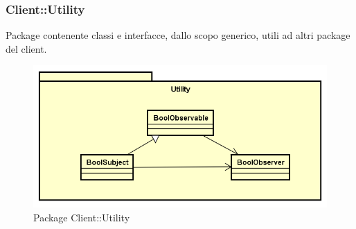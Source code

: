 \subsubsection{Client::Utility}
Package contenente classi e interfacce, dallo scopo generico, utili ad altri package del client.
\begin{figure}[h] \centering \includegraphics[width=\textwidth,height=\textheight,keepaspectratio]{images/diagrams/client/Client/Utility.png}
	\caption{Package Client::Utility}
\end{figure}
